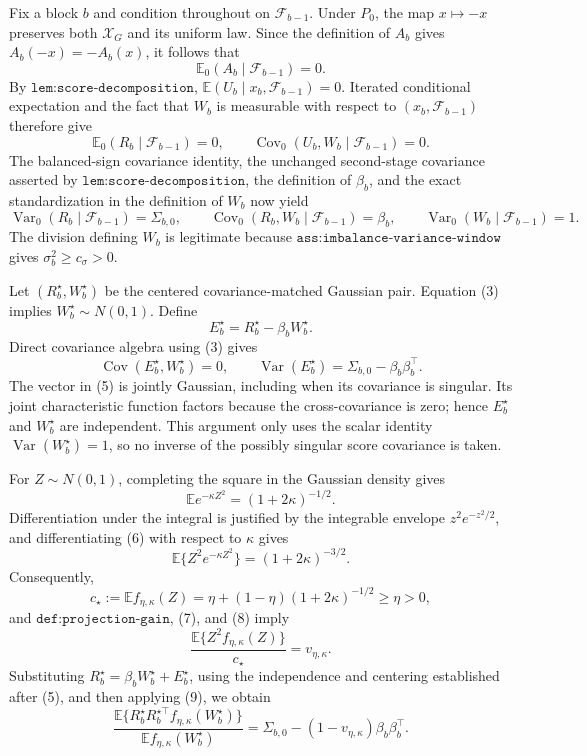 Fix a block \(b\) and condition throughout on \(\mathcal F_{b-1}\). Under \(P_0\), the map \(x\mapsto-x\) preserves both \(\mathcal X_G\) and its uniform law. Since the definition of \(A_b\) gives \(A_b(-x)=-A_b(x)\), it follows that
\[
\mathbb E_0(A_b\mid\mathcal F_{b-1})=0.                                      \tag{1}
\]
By \(\texttt{lem:score-decomposition}\),
\(\mathbb E(U_b\mid x_b,\mathcal F_{b-1})=0\). Iterated conditional expectation and the fact that \(W_b\) is measurable with respect to \((x_b,\mathcal F_{b-1})\) therefore give
\[
\mathbb E_0(R_b\mid\mathcal F_{b-1})=0,
\qquad
\operatorname{Cov}_0(U_b,W_b\mid\mathcal F_{b-1})=0.                         \tag{2}
\]
The balanced-sign covariance identity, the unchanged second-stage covariance asserted by \(\texttt{lem:score-decomposition}\), the definition of \(\beta_b\), and the exact standardization in the definition of \(W_b\) now yield
\[
\operatorname{Var}_0(R_b\mid\mathcal F_{b-1})=\Sigma_{b,0},
\qquad
\operatorname{Cov}_0(R_b,W_b\mid\mathcal F_{b-1})=\beta_b,
\qquad
\operatorname{Var}_0(W_b\mid\mathcal F_{b-1})=1.                            \tag{3}
\]
The division defining \(W_b\) is legitimate because \(\texttt{ass:imbalance-variance-window}\) gives \(\sigma_b^2\geq c_\sigma>0\).

Let \((R_b^\star,W_b^\star)\) be the centered covariance-matched Gaussian pair. Equation (3) implies \(W_b^\star\sim N(0,1)\). Define
\[
E_b^\star=R_b^\star-\beta_bW_b^\star.                                      \tag{4}
\]
Direct covariance algebra using (3) gives
\[
\operatorname{Cov}(E_b^\star,W_b^\star)=0,
\qquad
\operatorname{Var}(E_b^\star)=\Sigma_{b,0}-\beta_b\beta_b^\top.            \tag{5}
\]
The vector in (5) is jointly Gaussian, including when its covariance is singular. Its joint characteristic function factors because the cross-covariance is zero; hence \(E_b^\star\) and \(W_b^\star\) are independent. This argument only uses the scalar identity \(\operatorname{Var}(W_b^\star)=1\), so no inverse of the possibly singular score covariance is taken.

For \(Z\sim N(0,1)\), completing the square in the Gaussian density gives
\[
\mathbb E e^{-\kappa Z^2}=(1+2\kappa)^{-1/2}.                               \tag{6}
\]
Differentiation under the integral is justified by the integrable envelope \(z^2e^{-z^2/2}\), and differentiating (6) with respect to \(\kappa\) gives
\[
\mathbb E\{Z^2e^{-\kappa Z^2}\}=(1+2\kappa)^{-3/2}.                        \tag{7}
\]
Consequently,
\[
c_\star:=\mathbb E f_{\eta,\kappa}(Z)
=\eta+(1-\eta)(1+2\kappa)^{-1/2}\geq\eta>0,                               \tag{8}
\]
and \(\texttt{def:projection-gain}\), (7), and (8) imply
\[
\frac{\mathbb E\{Z^2f_{\eta,\kappa}(Z)\}}{c_\star}
=v_{\eta,\kappa}.                                                          \tag{9}
\]
Substituting \(R_b^\star=\beta_bW_b^\star+E_b^\star\), using the independence and centering established after (5), and then applying (9), we obtain
\[
\frac{\mathbb E\{R_b^\star R_b^{\star\top}f_{\eta,\kappa}(W_b^\star)\}}
     {\mathbb E f_{\eta,\kappa}(W_b^\star)}
=\Sigma_{b,0}-(1-v_{\eta,\kappa})\beta_b\beta_b^\top.                    \tag{10}
\]

